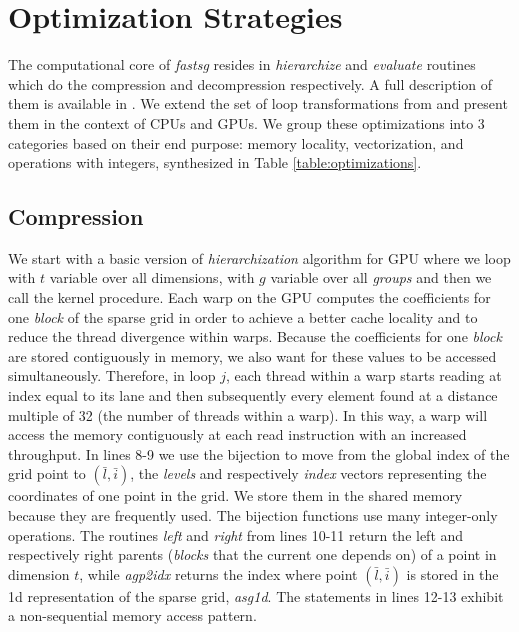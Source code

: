 \section{Optimization Strategies}
\label{sec:op_strategies}

The computational core of \textit{fastsg} resides in \textit{hierarchize} and
\textit{evaluate} routines which do the compression and decompression
respectively. A full description of them is available in
\cite{Murarasu:2011:CDS:1941553.1941559}. We extend the set of loop
transformations from \cite{murarasu12fastsg:} and present them in the context of
CPUs and GPUs. We group these optimizations into 3 categories based on their end
purpose: memory locality, vectorization, and operations with integers,
synthesized in Table \ref{table:optimizations}.

\subsection{Compression}

We start with a basic version of \textit{hierarchization} algorithm for GPU
where we loop with $t$ variable over all dimensions, with $g$ variable over all
\textit{groups} and then we call the kernel procedure. Each warp on the GPU
computes the coefficients for one \textit{block} of the sparse grid in order to
achieve a better cache locality and to reduce the thread divergence within
warps. Because the coefficients for one \textit{block} are stored contiguously
in memory, we also want for these values to be accessed simultaneously.
Therefore, in loop $j$, each thread within a warp starts reading at index equal
to its lane and then subsequently every element found at a distance multiple of 32 (the
number of threads within a warp). In this way, a warp will access the memory
contiguously at each read instruction with an increased throughput. In lines
8-9 we use the bijection to move from the global index of the grid point to
$(\bar{l}, \bar{i})$, the \textit{levels} and respectively \textit{index}
vectors representing the coordinates of one point in the grid. We store them in the
shared memory because they are frequently used. The bijection functions use many
integer-only operations. The routines \textit{left} and \textit{right}
from lines 10-11 return the left and respectively right parents (\textit{blocks}
that the current one depends on) of a point in dimension $t$, while
\textit{agp2idx} returns the index where point $(\bar{l}, \bar{i})$ is stored in
the 1d representation of the sparse grid, \textit{asg1d}. The statements in
lines 12-13 exhibit a non-sequential memory access pattern.


